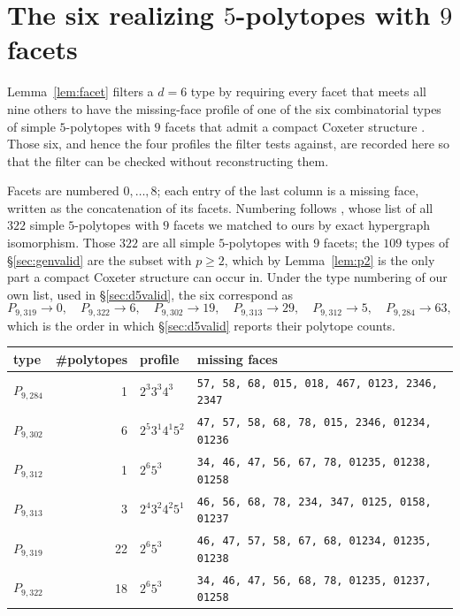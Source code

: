\documentclass[11pt,reqno]{amsart}
\theoremstyle{plain}
\theoremstyle{definition}
\newcommand{\DFiveTypes}{109}
\begin{document}
\appendix

\section{The six realizing $5$-polytopes with $9$ facets}
\label{app:d5types}

Lemma~\ref{lem:facet} filters a $d=6$ type by requiring every facet that meets all
nine others to have the missing-face profile of one of the six combinatorial types
of simple $5$-polytopes with $9$ facets that admit a compact Coxeter structure
\cite[\S6]{MaZheng2023}. Those six, and hence the four profiles the filter tests
against, are recorded here so that the filter can be checked without reconstructing
them.

Facets are numbered $0,\dots,8$; each entry of the last column is a missing face,
written as the concatenation of its facets. Numbering follows
\cite{MaZheng2023}, whose list of all $322$ simple $5$-polytopes with $9$ facets we
matched to ours by exact hypergraph isomorphism. Those $322$ are all simple
$5$-polytopes with $9$ facets; the $\DFiveTypes$ types of \S\ref{sec:genvalid} are
the subset with $p\ge2$, which by Lemma~\ref{lem:p2} is the only part a compact
Coxeter structure can occur in. Under the type numbering of our own list, used in
\S\ref{sec:d5valid}, the six correspond as
\[
P_{9,319}\!\to\!0,\quad P_{9,322}\!\to\!6,\quad P_{9,302}\!\to\!19,\quad
P_{9,313}\!\to\!29,\quad P_{9,312}\!\to\!5,\quad P_{9,284}\!\to\!63 ,
\]
which is the order in which \S\ref{sec:d5valid} reports their polytope counts.

\begin{center}
{\small
\begin{tabular}{l r l p{}}
\toprule
type & \#polytopes & profile & missing faces\\
\midrule
$P_{9,284}$ & 1 & $2^{3} 3^{3} 4^{3}$ & \texttt{57,\,58,\,68,\,015,\,018,\,467,\,0123,\,2346,\,2347} \\
$P_{9,302}$ & 6 & $2^{5} 3^{1} 4^{1} 5^{2}$ & \texttt{47,\,57,\,58,\,68,\,78,\,015,\,2346,\,01234,\,01236} \\
$P_{9,312}$ & 1 & $2^{6} 5^{3}$ & \texttt{34,\,46,\,47,\,56,\,67,\,78,\,01235,\,01238,\,01258} \\
$P_{9,313}$ & 3 & $2^{4} 3^{2} 4^{2} 5^{1}$ & \texttt{46,\,56,\,68,\,78,\,234,\,347,\,0125,\,0158,\,01237} \\
$P_{9,319}$ & 22 & $2^{6} 5^{3}$ & \texttt{46,\,47,\,57,\,58,\,67,\,68,\,01234,\,01235,\,01238} \\
$P_{9,322}$ & 18 & $2^{6} 5^{3}$ & \texttt{34,\,46,\,47,\,56,\,68,\,78,\,01235,\,01237,\,01258} \\
\bottomrule
\end{tabular}}
\end{center}
\end{document}
